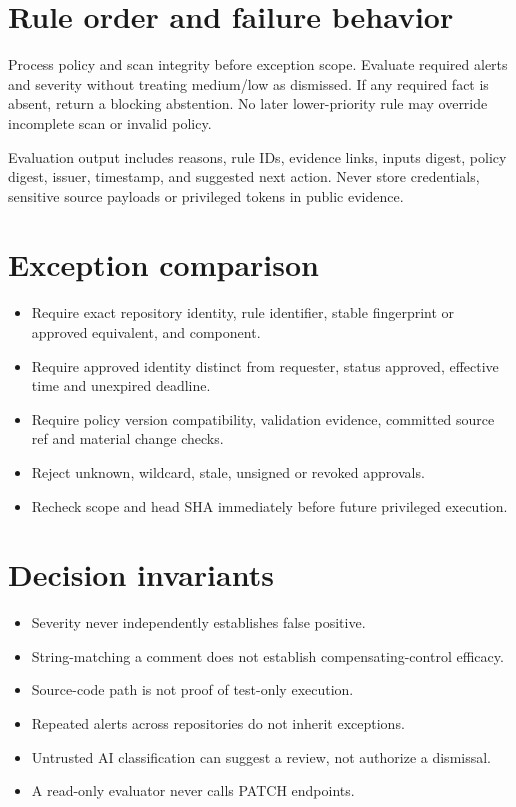 \documentclass[11pt,letterpaper]{article}
\begin{document}
\section{Rule order and failure behavior}
Process policy and scan integrity before exception scope. Evaluate required alerts and severity without treating medium/low as dismissed. If any required fact is absent, return a blocking abstention. No later lower-priority rule may override incomplete scan or invalid policy.

Evaluation output includes reasons, rule IDs, evidence links, inputs digest, policy digest, issuer, timestamp, and suggested next action. Never store credentials, sensitive source payloads or privileged tokens in public evidence.


\section{Exception comparison}
\begin{itemize}
\item Require exact repository identity, rule identifier, stable fingerprint or approved equivalent, and component.
\item Require approved identity distinct from requester, status approved, effective time and unexpired deadline.
\item Require policy version compatibility, validation evidence, committed source ref and material change checks.
\item Reject unknown, wildcard, stale, unsigned or revoked approvals.
\item Recheck scope and head SHA immediately before future privileged execution.
\end{itemize}

\section{Decision invariants}
\begin{itemize}
\item Severity never independently establishes false positive.
\item String-matching a comment does not establish compensating-control efficacy.
\item Source-code path is not proof of test-only execution.
\item Repeated alerts across repositories do not inherit exceptions.
\item Untrusted AI classification can suggest a review, not authorize a dismissal.
\item A read-only evaluator never calls PATCH endpoints.
\end{itemize}
\end{document}
